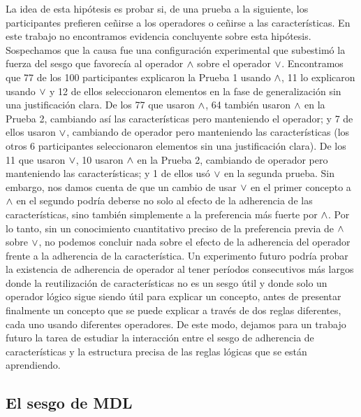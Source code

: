 La idea de esta hipótesis es probar si, de una prueba a la siguiente, los participantes prefieren ceñirse a los operadores o ceñirse a las características. En este trabajo no encontramos evidencia concluyente sobre esta hipótesis. Sospechamos que la causa fue una configuración experimental que subestimó la fuerza del sesgo que favorecía al operador $ \land $ sobre el operador $ \lor $. Encontramos que 77 de los 100 participantes explicaron la Prueba 1 usando $ \land $, 11 lo explicaron usando $ \lor $ y 12 de ellos seleccionaron elementos en la fase de generalización sin una justificación clara. De los 77 que usaron $ \land $, 64 también usaron $ \land $ en la Prueba 2, cambiando así las características pero manteniendo el operador; y 7 de ellos usaron $ \lor $, cambiando de operador pero manteniendo las características (los otros 6 participantes seleccionaron elementos sin una justificación clara). De los 11 que usaron $ \lor $, 10 usaron $ \land $ en la Prueba 2, cambiando de operador pero manteniendo las características; y 1 de ellos usó $ \lor $ en la segunda prueba. Sin embargo, nos damos cuenta de que un cambio de usar $ \lor $ en el primer concepto a $ \land $ en el segundo podría deberse no solo al efecto de la adherencia de las características, sino también simplemente a la preferencia más fuerte por $ \land$. Por lo tanto, sin un conocimiento cuantitativo preciso de la preferencia previa de $ \land $ sobre $ \lor $, no podemos concluir nada sobre el efecto de la adherencia del operador frente a la adherencia de la característica. Un experimento futuro podría probar la existencia de adherencia de operador al tener períodos consecutivos más largos donde la reutilización de características no es un sesgo útil y donde solo un operador lógico sigue siendo útil para explicar un concepto, antes de presentar finalmente un concepto que se puede explicar a través de dos reglas diferentes, cada uno usando diferentes operadores. De este modo, dejamos para un trabajo futuro la tarea de estudiar la interacción entre el sesgo de adherencia de características y la estructura precisa de las reglas lógicas que se están aprendiendo.


\subsection{El sesgo de MDL} \label{Resultados:MDLbias} 


